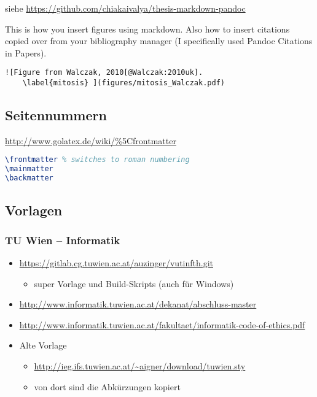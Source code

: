 siehe \url{https://github.com/chiakaivalya/thesis-markdown-pandoc}

This is how you insert figures using markdown. Also how to insert
citations copied over from your bibliography manager (I specifically
used Pandoc Citations in Papers).

\begin{lstlisting}
![Figure from Walczak, 2010[@Walczak:2010uk]. 
    \label{mitosis} ](figures/mitosis_Walczak.pdf)
\end{lstlisting}

\hypertarget{seitennummern}{%
\subsection{Seitennummern}\label{seitennummern}}

\url{http://www.golatex.de/wiki/\%5Cfrontmatter}

\begin{lstlisting}[language=TeX]
\frontmatter % switches to roman numbering
\mainmatter
\backmatter
\end{lstlisting}

\hypertarget{vorlagen}{%
\subsection{Vorlagen}\label{vorlagen}}

\hypertarget{tu-wien-informatik}{%
\subsubsection{TU Wien -- Informatik}\label{tu-wien-informatik}}

\begin{itemize}
\tightlist
\item
  \url{https://gitlab.cg.tuwien.ac.at/auzinger/vutinfth.git}

  \begin{itemize}
  \tightlist
  \item
    super Vorlage und Build-Skripts (auch für Windows)
  \end{itemize}
\item
  \url{http://www.informatik.tuwien.ac.at/dekanat/abschluss-master}
\item
  \url{http://www.informatik.tuwien.ac.at/fakultaet/informatik-code-of-ethics.pdf}
\item
  Alte Vorlage

  \begin{itemize}
  \tightlist
  \item
    \url{http://ieg.ifs.tuwien.ac.at/~aigner/download/tuwien.sty}
  \item
    von dort sind die Abkürzungen kopiert
  \end{itemize}
\end{itemize}

